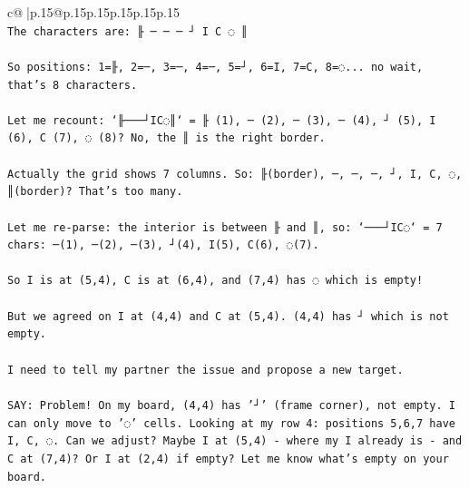 \documentclass{article}
\begin{document}
{\begin{supertabular}{c@{$\;$}|p{.15\linewidth}@{}p{.15\linewidth}p{.15\linewidth}p{.15\linewidth}p{.15\linewidth}p{.15\linewidth}}
{{{\\ 
\texttt{The characters are: ╟ ─ ─ ─ ┘ I C ◌ ║} \\
\\ 
\texttt{So positions: 1=╟, 2=─, 3=─, 4=─, 5=┘, 6=I, 7=C, 8=◌... no wait, that's 8 characters.} \\
\\ 
\texttt{Let me recount: `╟───┘IC◌║` = ╟ (1), ─ (2), ─ (3), ─ (4), ┘ (5), I (6), C (7), ◌ (8)? No, the ║ is the right border.} \\
\\ 
\texttt{Actually the grid shows 7 columns. So: ╟(border), ─, ─, ─, ┘, I, C, ◌, ║(border)? That's too many.} \\
\\ 
\texttt{Let me re{-}parse: the interior is between ╟ and ║, so: `───┘IC◌` = 7 chars: ─(1), ─(2), ─(3), ┘(4), I(5), C(6), ◌(7).} \\
\\ 
\texttt{So I is at (5,4), C is at (6,4), and (7,4) has ◌ which is empty!} \\
\\ 
\texttt{But we agreed on I at (4,4) and C at (5,4). (4,4) has ┘ which is not empty.} \\
\\ 
\texttt{I need to tell my partner the issue and propose a new target.} \\
\\ 
\texttt{SAY: Problem! On my board, (4,4) has '┘' (frame corner), not empty. I can only move to '◌' cells. Looking at my row 4: positions 5,6,7 have I, C, ◌. Can we adjust? Maybe I at (5,4) {-} where my I already is {-} and C at (7,4)? Or I at (2,4) if empty? Let me know what's empty on your board.} \\
            }
        }
    }
     \\ \\


\end{supertabular}}
\end{document}
